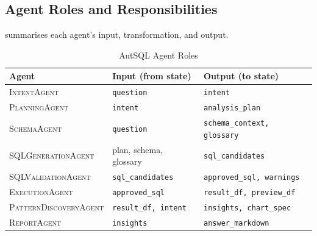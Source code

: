 \documentclass[conference]{IEEEtran}
\begin{document}

\subsection{Agent Roles and Responsibilities}
\label{sec:design:agents}

 summarises each agent's input, transformation, and output.

\begin{table}[t]
  \centering
  \caption{AutSQL Agent Roles}
  \label{tab:agents}
  \begin{tabular}{@{}lll@{}}
    \toprule
    \textbf{Agent} & \textbf{Input (from state)} & \textbf{Output (to state)} \\
    \midrule
    \textsc{IntentAgent}         & \texttt{question}          & \texttt{intent} \\
    \textsc{PlanningAgent}       & \texttt{intent}            & \texttt{analysis\_plan} \\
    \textsc{SchemaAgent}         & \texttt{question}          & \texttt{schema\_context, glossary} \\
    \textsc{SQLGenerationAgent}  & plan, schema, glossary     & \texttt{sql\_candidates} \\
    \textsc{SQLValidationAgent}  & \texttt{sql\_candidates}   & \texttt{approved\_sql, warnings} \\
    \textsc{ExecutionAgent}      & \texttt{approved\_sql}     & \texttt{result\_df, preview\_df} \\
    \textsc{PatternDiscoveryAgent} & \texttt{result\_df, intent} & \texttt{insights, chart\_spec} \\
    \textsc{ReportAgent}         & \texttt{insights}          & \texttt{answer\_markdown} \\
    \bottomrule
  \end{tabular}
\end{table}
\end{document}
